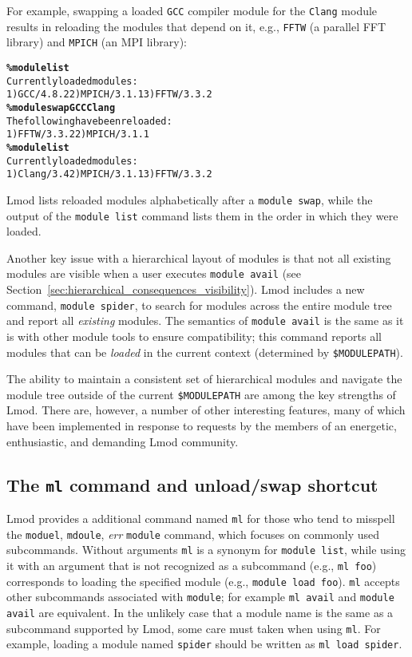For example, swapping a loaded \texttt{\small GCC} compiler module for the
\texttt{\small {Clang}} module results in reloading the modules that
depend on it, e.g., \texttt{\small FFTW} (a parallel FFT library) and
\texttt{\small MPICH} (an MPI library):
{\small
  \begin{alltt}
    \textbf{\% module list}
    Currently loaded modules:
    1) GCC/4.8.2  2) MPICH/3.1.1  3) FFTW/3.3.2
    \textbf{\% module swap GCC Clang}
    The following have been reloaded:
    1) FFTW/3.3.2  2) MPICH/3.1.1
    \textbf{\% module list}
    Currently loaded modules:
    1) Clang/3.4  2) MPICH/3.1.1  3) FFTW/3.3.2
\end{alltt}
}
\noindent
Lmod lists reloaded modules
alphabetically after a \texttt{\small module swap}, while the output of
the \texttt{\small module list} command lists them in the order in which
they were loaded.

Another key issue with a hierarchical layout of modules is that not all
existing modules are visible when a user executes \texttt{\small module avail} (see
Section~\ref{sec:hierarchical_consequences_visibility}). Lmod includes a
new command, \texttt{\small module spider}, to search for modules across the
entire module tree and report all \emph{existing} modules. The semantics of
\texttt{\small module avail} is the same as it is with other module tools to ensure
compatibility; this command reports all modules that can be \emph{loaded} in the
current context (determined by \texttt{\small \$MODULEPATH}).

The ability to maintain a consistent set of hierarchical modules and navigate the
module tree outside of the current \texttt{\small \$MODULEPATH} are among the key
strengths of Lmod. There are, however, a number of other interesting features, many
of which have been implemented in response to requests by the members of an
energetic, enthusiastic, and demanding Lmod community.

\subsection{The \texttt{\small ml} command and unload/swap shortcut}

Lmod provides a additional command named \texttt{\small ml} for those who tend to
misspell the \texttt{\small moduel}, \texttt{\small mdoule}, \emph{err}
\texttt{\small module} command, which focuses on
commonly used subcommands. Without arguments \texttt{\small ml} is a synonym for
\texttt{\small module list}, while using it with an argument that is not
recognized as a subcommand (e.g., \texttt{\small ml foo}) corresponds to loading
the specified module (e.g., \texttt{\small module load foo}).
\texttt{\small ml} accepts other subcommands associated with \texttt{\small module};
for example \texttt{\small ml avail} and \texttt{\small module avail} are equivalent.
In the unlikely case that a module name is the same as a subcommand supported by Lmod, 
some care must taken when using \texttt{\small ml}. For example, loading a module
named \texttt{\small spider} should be written as \texttt{\small ml load spider}.

